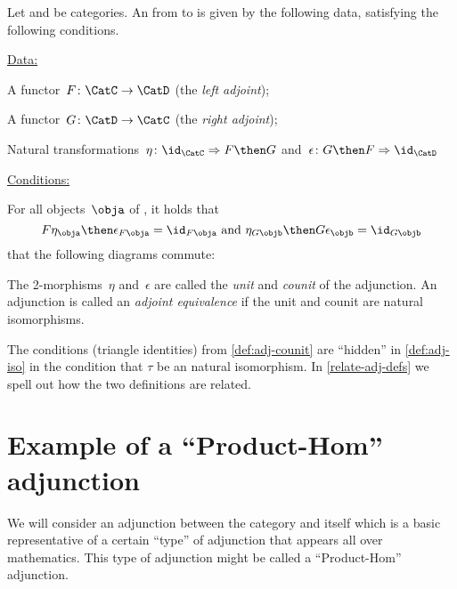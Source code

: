 \begin{ctdefinition}
  \label{def:adj-counit}
  \label{def:cat-adjunction-v2}
  Let \CatC and \CatD be categories. An \emph{} from \CatC to \CatD is given by the following data, satisfying the following conditions.

  \underline{Data:}
  \begin{compactenum}
    \item A functor~$F\colon \CatC \to \CatD$ (the \emph{left adjoint});
    \item A functor~$G\colon \CatD \to \CatC$ (the \emph{right adjoint});
    \item Natural transformations~$\eta \colon \id_\CatC \Rightarrow F \then G$ and~$\epsilon \colon G \then F \Rightarrow \id_\CatD$
  \end{compactenum}

  \underline{Conditions:}
  \begin{compactenum}
    \item For all objects~$\obja$ of \CatC, it holds that
    \begin{equation*}
      F\eta_\obja \then \epsilon_{F\obja} = \id_{F\obja} \text{ and }  \eta_{G\objb} \then G\epsilon_\objb = \id_{G\objb}
    \end{equation*}
     that the following diagrams commute:

    \begin{center}
    \end{center}
  \end{compactenum}

  The 2-morphisms~$\eta$ and~$\epsilon$ are called the \emph{unit} and \emph{counit} of the adjunction.
  An adjunction is called an \emph{adjoint equivalence} if the unit and counit are natural isomorphisms.
\end{ctdefinition}

\begin{remark}
  The conditions (triangle identities) from \cref{def:adj-counit} are ``hidden'' in \cref{def:adj-iso} in the condition that $\tau$ be an natural isomorphism. In \cref{relate-adj-defs} we spell out how the two definitions are related.
\end{remark}


\section{Example of a ``Product-Hom'' adjunction}
We will consider an adjunction between the category \Set and itself which is a basic representative of a certain ``type'' of adjunction that appears all over mathematics. This type of adjunction might be called a ``Product-Hom'' adjunction.


